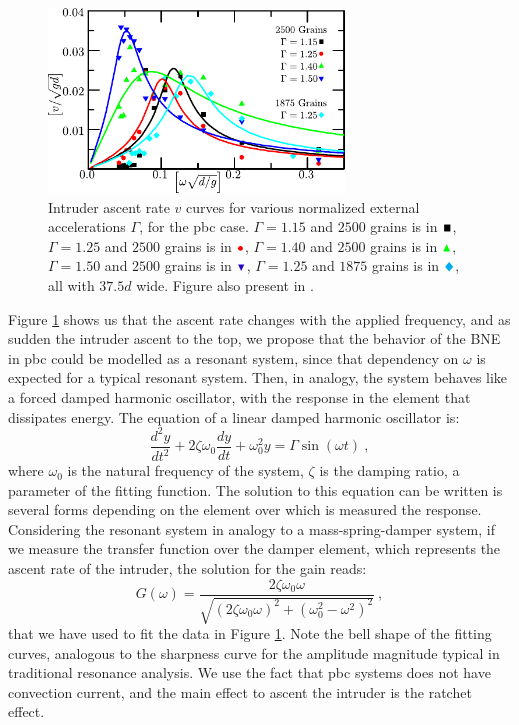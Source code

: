 \begin{figure}[H]
    \centering
    \includegraphics[width=0.7\textwidth]{04-figuras/BNE_ResonancePBC.pdf}
    \caption[BNE with periodic boundary: resonance.]{Intruder ascent rate $v$ curves for various normalized external accelerations $ \Gamma $, for the pbc case. $\Gamma = 1.15$ and $2500$ grains is in $\textcolor{black}{\blacksquare}$, $\Gamma = 1.25$ and $2500$ grains is in $\textcolor{red}{\bullet}$, $\Gamma = 1.40$ and $2500$ grains is in $\textcolor{green}{\blacktriangle}$, $\Gamma = 1.50$ and $2500$ grains is in $\textcolor{blue}{\blacktriangledown}$, $\Gamma = 1.25$ and $1875$ grains is in $\textcolor{cyan}{\Diamondblack}$, all with $37.5d$ wide. Figure also present in \cite{Large-deviation_quantification_of_boundary_conditions_on_the_Brazil_nut_effect}.}
    \label{fig:BNE_resonance}
\end{figure}

    Figure \ref{fig:BNE_resonance} shows us that the ascent rate changes with the applied frequency, and as sudden the intruder ascent to the top, we propose that the behavior of the BNE in pbc could be modelled as a resonant system, since that dependency on $\omega$ is expected for a typical resonant system. Then, in analogy, the system behaves like a forced damped harmonic oscillator, with the response in the element that dissipates energy. The equation of a linear damped harmonic oscillator is:
%
\begin{equation}
    \frac{d^2 y}{d t^2} + 2 \zeta \omega_0 \frac{d y} {d t} + \omega_0^2 y = \Gamma \sin(\omega t) ~,  
\end{equation}
%
where $\omega_0$ is the natural frequency of the system, $\zeta$ is the damping ratio, a parameter of the fitting function. The solution to this equation can be written is several forms depending on the element over which is measured the response. Considering the resonant system in analogy to a mass-spring-damper system, if we measure the transfer function over the damper element, which represents the ascent rate of the intruder, the solution for the gain reads:
%
\begin{equation}
    G(\omega) = \frac{2 \zeta \omega_0 \omega }{ \sqrt{(2 \zeta \omega_0 \omega)^2 + (\omega_0^2 - \omega^2)^2 }}~,
    \label{equ:TF}
\end{equation}
%
that we have used to fit the data in Figure \ref{fig:BNE_resonance}. Note the bell shape of the fitting curves, analogous to the sharpness curve for the amplitude magnitude typical in traditional resonance analysis. We use the fact that pbc systems does not have convection current, and the main effect to ascent the intruder is the ratchet effect.

